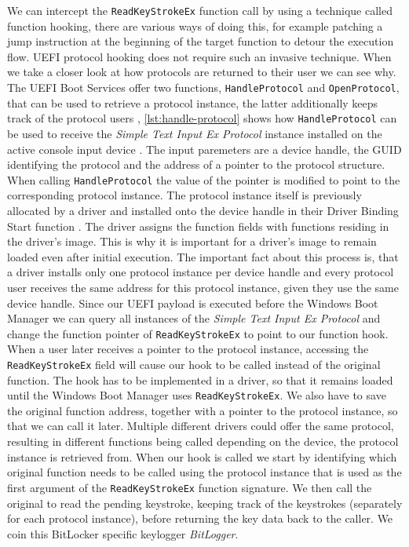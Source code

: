 We can intercept the \lstinline{ReadKeyStrokeEx} function call by using a technique called function hooking, there are various ways of doing this, for example patching a jump instruction at the beginning of the target function to detour the execution flow.  \ac{UEFI} protocol hooking does not require such an invasive technique. When we take a closer look at how protocols are returned to their user we can see why. The \ac{UEFI} Boot Services offer two functions, \lstinline{HandleProtocol} and \lstinline{OpenProtocol}, that can be used to retrieve a protocol instance, the latter additionally keeps track of the protocol users \cite[7.3. EFI_BOOT_SERVICES.OpenProtocol()]{uefi-spec}, \autoref{lst:handle-protocol} shows how \lstinline{HandleProtocol} can be used to receive the \emph{Simple Text Input Ex Protocol} instance installed on the active console input device \cite[4.3 EFI System Table]{uefi-spec}. The input paremeters are a device handle, the \ac{GUID} identifying the protocol and the address of a pointer to the protocol structure. When calling \lstinline{HandleProtocol} the value of the pointer is modified to point to the corresponding protocol instance. The protocol instance itself is previously allocated by a driver and installed onto the device handle in their Driver Binding Start function . The driver assigns the function fields with functions residing in the driver's image. This is why it is important for a driver's image to remain loaded even after initial execution. The important fact about this process is, that a driver installs only one protocol instance per device handle and every protocol user receives the same address for this protocol instance, given they use the same device handle. Since our \ac{UEFI} payload is executed before the Windows Boot Manager we can query all instances of the \emph{Simple Text Input Ex Protocol} and change the function pointer of \lstinline{ReadKeyStrokeEx} to point to our function hook. When a user later receives a pointer to the protocol instance, accessing the \lstinline{ReadKeyStrokeEx} field will cause our hook to be called instead of the original function. The hook has to be implemented in a driver, so that it remains loaded until the Windows Boot Manager uses \lstinline{ReadKeyStrokeEx}. We also have to save the original function address, together with a pointer to the protocol instance, so that we can call it later. Multiple different drivers could offer the same protocol, resulting in different functions being called depending on the device, the protocol instance is retrieved from. When our hook is called we start by identifying which original function needs to be called using the protocol instance that is used as the first argument of the \lstinline{ReadKeyStrokeEx} function signature. We then call the original to read the pending keystroke, keeping track of the keystrokes (separately for each protocol instance), before returning the key data back to the caller. We coin this BitLocker specific keylogger \emph{BitLogger}.

